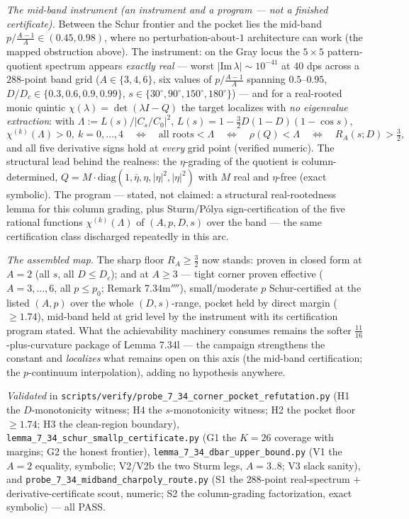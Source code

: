\documentclass[
]{article}
\begin{document}
\emph{The mid-band instrument (an instrument and a program --- not a finished
certificate).} Between the Schur frontier and the pocket lies the mid-band
$p\big/\tfrac{A-1}A\in(0.45,0.98)$, where no perturbation-about-$1$
architecture can work (the mapped obstruction above). The instrument: on the
Gray locus the $5\times5$ pattern-quotient spectrum appears \emph{exactly
real} --- worst $|\mathrm{Im}\,\lambda|\sim10^{-41}$ at $40$ dps across a
$288$-point band grid ($A\in\{3,4,6\}$, six values of $p\big/\tfrac{A-1}A$
spanning $0.5$--$0.95$, $D/D_c\in\{0.3,0.6,0.9,0.99\}$,
$s\in\{30^\circ,90^\circ,150^\circ,180^\circ\}$) --- and for a real-rooted
monic quintic $\chi(\lambda)=\det(\lambda I-Q)$ the target localizes with
\emph{no eigenvalue extraction}: with
$\Lambda:=L(s)/|C_s/C_0|^2$, $L(s)=1-\tfrac32D(1-D)(1-\cos s)$,
\[
  \chi^{(k)}(\Lambda)>0,\ k=0,\dots,4
  \quad\Longleftrightarrow\quad\text{all roots}<\Lambda
  \quad\Longleftrightarrow\quad\rho(Q)<\Lambda
  \quad\Longleftrightarrow\quad R_A(s;D)>\tfrac32,
\]
and all five derivative signs hold at \emph{every} grid point (verified
numeric). The structural lead behind the realness: the $\eta$-grading of the
quotient is column-determined, $Q=M\cdot\mathrm{diag}(1,\bar\eta,\eta,
|\eta|^2,|\eta|^2)$ with $M$ real and $\eta$-free (exact symbolic). The
program --- stated, not claimed: a structural real-rootedness lemma for this
column grading, plus Sturm/P\'olya sign-certification of the five rational
functions $\chi^{(k)}(\Lambda)$ of $(A,p,D,s)$ over the band --- the same
certification class discharged repeatedly in this arc.

\emph{The assembled map.} The sharp floor $R_A\ge\tfrac32$ now stands: proven
in closed form at $A=2$ (all $s$, all $D\le D_c$); and at $A\ge3$ --- tight
corner proven effective ($A=3,\dots,6$, all $p\le p_0$; Remark 7.34m$''''$),
small/moderate $p$ Schur-certified at the listed $(A,p)$ over the whole
$(D,s)$-range, pocket held by direct margin ($\ge1.74$), mid-band held at grid
level by the instrument with its certification program stated. What the
achievability machinery consumes remains the softer
$\tfrac{11}{16}$-plus-curvature package of Lemma 7.34l --- the campaign
strengthens the constant and \emph{localizes} what remains open on this axis
(the mid-band certification; the $p$-continuum interpolation), adding no
hypothesis anywhere.

\emph{Validated} in
\texttt{scripts/verify/probe\_7\_34\_corner\_pocket\_refutation.py} (H1 the
$D$-monotonicity witness; H4 the $s$-monotonicity witness; H2 the pocket floor
$\ge1.74$; H3 the clean-region boundary),
\texttt{lemma\_7\_34\_schur\_smallp\_certificate.py} (G1 the $K=26$ coverage
with margins; G2 the honest frontier),
\texttt{lemma\_7\_34\_dbar\_upper\_bound.py} (V1 the $A=2$ equality, symbolic;
V2/V2b the two Sturm legs, $A=3..8$; V3 slack sanity), and
\texttt{probe\_7\_34\_midband\_charpoly\_route.py} (S1 the $288$-point
real-spectrum $+$ derivative-certificate scout, numeric; S2 the column-grading
factorization, exact symbolic) --- all PASS.
\end{document}
